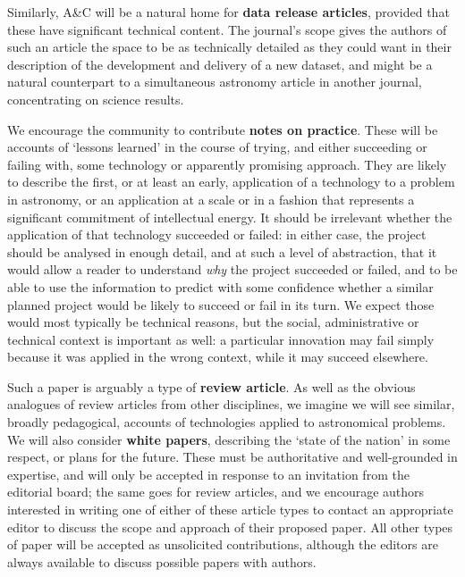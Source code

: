Similarly,  A\&C will be a natural home for
\textbf{data release articles}, provided that these have significant technical content. The journal's scope gives the authors of such an article the space to be as technically detailed as they could want in their description of the development and delivery of a new dataset, and might be a natural counterpart to a simultaneous astronomy article in another journal, concentrating on science results.

We encourage the community to contribute \textbf{notes on practice}.  These will be accounts of `lessons learned' in the course of trying, and either succeeding or failing with, some technology or apparently promising approach. They are likely to describe the first, or at least an early, application of a technology to a problem in astronomy, or an application at a scale or in a fashion that represents a significant commitment of intellectual energy.  It should be irrelevant whether the application of that technology succeeded or failed: in either case, the project should be analysed in enough detail, and at such a level of abstraction, that it would allow a reader to understand \emph{why} the project succeeded or failed, and to be able to use the information to predict with some confidence whether a similar planned project would be likely to succeed or fail in its turn. We expect those would most typically be technical reasons, but the social, administrative or technical context is important as well: a particular innovation may fail simply because it was applied in the wrong context, while it may succeed elsewhere.

Such a paper is arguably a type of \textbf{review article}.  As well as the obvious analogues of review articles from other disciplines, we imagine we will see similar, broadly pedagogical, accounts of technologies applied to astronomical problems.  We will also consider \textbf{white papers}, describing the `state of the nation' in some respect, or plans for the future.  These must be authoritative and well-grounded in expertise, and will only be accepted in response to an invitation from the editorial board; the same goes for review articles, and we encourage authors interested in writing one of either of these article types to contact an appropriate editor to discuss the scope and approach of their proposed paper. All other types of paper will be accepted as unsolicited contributions, although the editors are always available to discuss possible papers with authors. 

